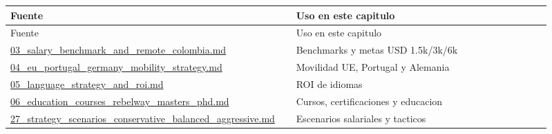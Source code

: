 \begin{center}
\scriptsize
\begin{longtable}{>{\raggedright\arraybackslash}p{0.455\linewidth} >{\raggedright\arraybackslash}p{0.455\linewidth}}
\toprule
Fuente & Uso en este capitulo \\
\midrule
\endfirsthead
\toprule
Fuente & Uso en este capitulo \\
\midrule
\endhead
\href{file:///E:/Laboral/03_salary_benchmark_and_remote_colombia.md}{03\_salary\_benchmark\_and\_remote\_colombia.md} & Benchmarks y metas USD 1.5k/3k/6k \\
\href{file:///E:/Laboral/04_eu_portugal_germany_mobility_strategy.md}{04\_eu\_portugal\_germany\_mobility\_strategy.md} & Movilidad UE, Portugal y Alemania \\
\href{file:///E:/Laboral/05_language_strategy_and_roi.md}{05\_language\_strategy\_and\_roi.md} & ROI de idiomas \\
\href{file:///E:/Laboral/06_education_courses_rebelway_masters_phd.md}{06\_education\_courses\_rebelway\_masters\_phd.md} & Cursos, certificaciones y educacion \\
\href{file:///E:/Laboral/27_strategy_scenarios_conservative_balanced_aggressive.md}{27\_strategy\_scenarios\_conservative\_balanced\_aggressive.md} & Escenarios salariales y tacticos \\
\bottomrule
\end{longtable}
\end{center}


